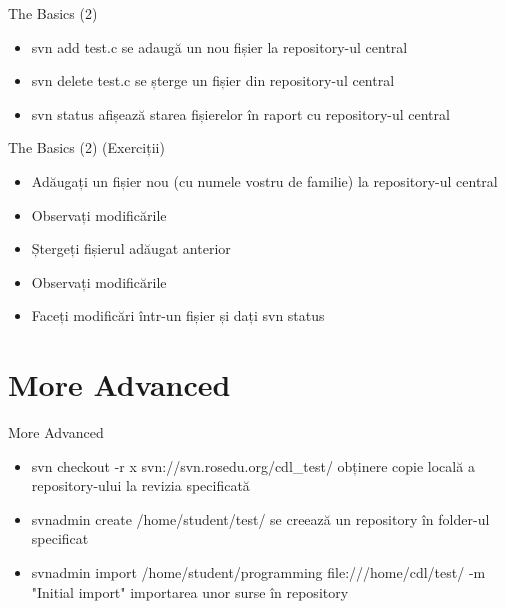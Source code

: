 \documentclass{beamer}
\begin{document}
\begin{frame}{The Basics (2)}
\begin{itemize} %
\item svn add test.c
\newline se adaugă un nou fișier la repository-ul central
\newline 
\item svn delete test.c
\newline se șterge un fișier din repository-ul central
\newline 
\item svn status
\newline afișează starea fișierelor în raport cu repository-ul central
\end{itemize}
\end{frame}

\begin{frame}{The Basics (2) (Exerciții)}
\begin{itemize} %
\item Adăugați un fișier nou (cu numele vostru de familie) la repository-ul central
\newline 
\item Observați modificările
\newline 
\item Ștergeți fișierul adăugat anterior
\newline 
\item Observați modificările
\newline 
\item Faceți modificări într-un fișier și dați svn status
\end{itemize}
\end{frame}

\section{More Advanced}
\frame{\tableofcontents[currentsection]}

\begin{frame}{More Advanced}
\begin{itemize} %
\item svn checkout -r x svn://svn.rosedu.org/cdl\_test/
\newline obținere copie locală a repository-ului la revizia specificată
\newline 
\item svnadmin create /home/student/test/
\newline se creează un repository în folder-ul specificat
\newline 
\item svnadmin import /home/student/programming 
\newline file:///home/cdl/test/ -m "Initial import"
\newline importarea unor surse în repository
\end{itemize}
\end{frame}
\end{document}
